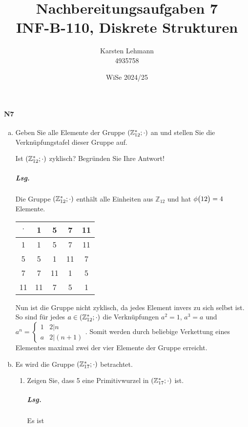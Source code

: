 \documentclass{scrreprt}
\author{Karsten Lehmann \\ 4935758}
\date{WiSe 2024/25}
\title{Nachbereitungsaufgaben 7\\INF-B-110, Diskrete Strukturen}
\begin{document}
\paragraph{N7}
\begin{enumerate}[(a)]
\item Geben Sie alle Elemente der Gruppe $\qty(\mathbb{Z}_{12}^*; \cdot)$ an und
  stellen Sie die Verknüpfungstafel dieser Gruppe auf.

  Ist $\qty(\mathbb{Z}_{12}^*; \cdot)$ zyklisch?
  Begründen Sie Ihre Antwort!

  \subparagraph{Lsg.} Die Gruppe $\qty(\mathbb{Z}_{12}^*; \cdot)$ enthält alle
  Einheiten aus $\mathbb{Z}_{12}$ und hat $\phi\qty\big(12) = 4$ Elemente.

  \begin{tabular}{|c|cccc|}
    \hline
    $\cdot$ & 1  & 5  & 7  & 11 \\
    \hline
    1       & 1  & 5  & 7  & 11 \\
    5       & 5  & 1  & 11 & 7  \\
    7       & 7  & 11 & 1  & 5  \\
    11      & 11 & 7  & 5  & 1  \\
    \hline
  \end{tabular}

  Nun ist die Gruppe nicht zyklisch, da jedes Element invers zu sich selbst ist.
  So sind für jedes $a \in \qty(\mathbb{Z}_{12}^*; \cdot)$ die Verknüpfungen
  $a^2 = 1$, $a^3 = a$ und $a^n = \begin{cases}
    1 & 2|n \\
    a & 2|(n + 1)
  \end{cases}$.
  Somit werden durch beliebige Verkettung eines Elementes maximal zwei der vier
  Elemente der Gruppe erreicht.

\item Es wird die Gruppe $\qty(\mathbb{Z}_{17}^*; \cdot)$ betrachtet.
  \begin{enumerate}[(1)]
  \item Zeigen Sie, dass 5 eine Primitivwurzel in
    $\qty(\mathbb{Z}_{17}^*; \cdot)$ ist.

    \subparagraph{Lsg.} Es ist


\end{enumerate}
\end{enumerate}
\end{document}

